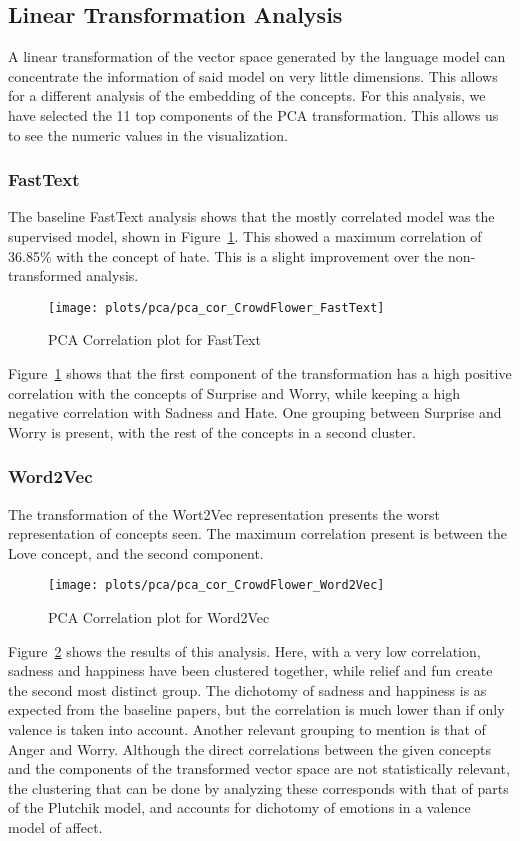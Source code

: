 \subsection{Linear Transformation Analysis}\label{sub:Linear Transformation Analysis}
A linear transformation of the vector space generated by the language model can concentrate the information of said model on very little dimensions. This allows for a different analysis of the embedding of the concepts. For this analysis, we have selected the 11 top components of the PCA transformation. This allows us to see the numeric values in the visualization.

\subsubsection{FastText}
The baseline FastText analysis shows that the mostly correlated model was the supervised model, shown in Figure~\ref{fig:pca_cor_CrowdFlower_FastText}. This showed a maximum correlation of 36.85\% with the concept of hate. This is a slight improvement over the non-transformed analysis.
\begin{figure}[H]
  \texttt{[image: plots/pca/pca\_cor\_CrowdFlower\_FastText]}
  \centering
  \caption{PCA Correlation plot for FastText}\label{fig:pca_cor_CrowdFlower_FastText}
\end{figure}
Figure~\ref{fig:pca_cor_CrowdFlower_FastText} shows that the first component of the transformation has a high positive correlation with the concepts of Surprise and Worry, while keeping a high negative correlation with Sadness and Hate. One grouping between Surprise and Worry is present, with the rest of the concepts in a second cluster.

\subsubsection{Word2Vec}
The transformation of the Wort2Vec representation presents the worst representation of concepts seen. The maximum correlation present is between the Love concept, and the second component.
\begin{figure}[H]
  \texttt{[image: plots/pca/pca\_cor\_CrowdFlower\_Word2Vec]}
  \centering
  \caption{PCA Correlation plot for Word2Vec}\label{fig:pca_cor_CrowdFlower_Word2Vec}
\end{figure}
Figure~\ref{fig:pca_cor_CrowdFlower_Word2Vec} shows the results of this analysis. Here, with a very low correlation, sadness and happiness have been clustered together, while relief and fun create the second most distinct group. The dichotomy of sadness and happiness is as expected from the baseline papers, but the correlation is much lower than if only valence is taken into account.
Another relevant grouping to mention is that of Anger and Worry. Although the direct correlations between the given concepts and the components of the transformed vector space are not statistically relevant, the clustering that can be done by analyzing these corresponds with that of parts of the Plutchik model, and accounts for dichotomy of emotions in a valence model of affect.

